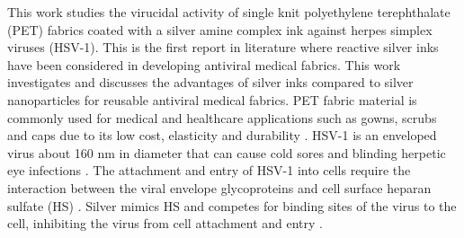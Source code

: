 \documentclass[10pt,letterpaper]{article}
\begin{document}






This work studies the virucidal activity of single knit
polyethylene terephthalate (PET) fabrics coated with a silver amine complex ink \cite{Walker:12}
against herpes simplex viruses (HSV-1). This is the first report in literature where reactive silver inks have been considered in developing antiviral medical fabrics. This work investigates and discusses the advantages of silver inks compared to silver nanoparticles for reusable antiviral medical fabrics. 
PET fabric material is commonly used for medical and healthcare applications such as gowns, scrubs and caps due to its low cost, elasticity and durability  \cite{Rigby:97}. 
HSV-1 is an enveloped virus about 160 nm in diameter that can cause cold sores and blinding herpetic eye infections \cite{wald:07}. 
The attachment and entry of HSV-1 into cells require the interaction between the viral envelope glycoproteins and cell surface heparan sulfate (HS) \cite{baram-pinto_2009,akbarzadeh:2018}. Silver mimics HS and competes for binding sites of the virus to the cell, inhibiting the virus from cell attachment and entry \cite{baram-pinto_2009,Galdiero:11}.
\end{document}
